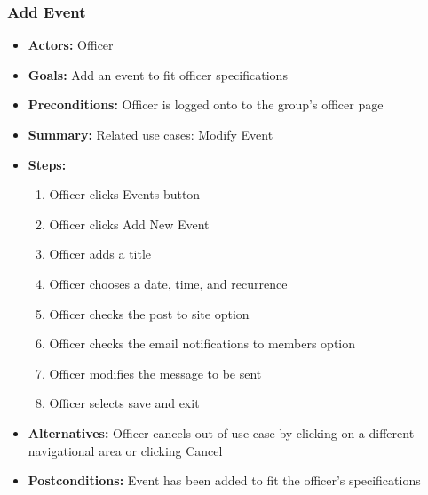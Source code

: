 		\subsubsection{Add Event}
			\begin{itemize}
				\item{\textbf{Actors:} Officer}
				\item{\textbf{Goals:} Add an event to fit officer specifications}
				\item{\textbf{Preconditions:} Officer is logged onto to the group's officer page}
				\item{\textbf{Summary:} Related use cases: Modify Event}
				\item{\textbf{Steps:}
				\begin{enumerate}
					\item{Officer clicks Events button}
					\item{Officer clicks Add New Event}
					\item{Officer adds a title}
					\item{Officer chooses a date, time, and recurrence}
					\item{Officer checks the post to site option}
					\item{Officer checks the email notifications to members option}
					\item{Officer modifies the message to be sent}
					\item{Officer selects save and exit}
				\end{enumerate}
				}
				\item{\textbf{Alternatives:} Officer cancels out of use case by clicking on a different navigational area or clicking Cancel}
				\item{\textbf{Postconditions:} Event has been added to fit the officer's specifications}
			\end{itemize}
